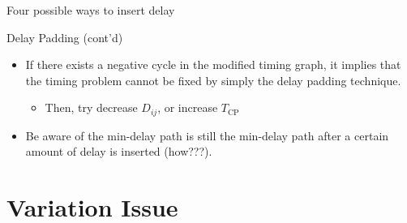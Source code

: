 \documentclass[10pt,ignorenonframetext,mathserif,onlymath]{beamer}
\providecommand{\tightlist}{%
  \setlength{\itemsep}{0pt}\setlength{\parskip}{0pt}}
\begin{document}
\begin{frame}{Four possible ways to insert delay}
\protect\hypertarget{four-possible-ways-to-insert-delay}{}

\begin{figure}[htpb]
\centering
{}
\subfigure[$p_s$, $p_h$ independently]{

}
\subfigure[$p_s = p_h$]{

}
\subfigure[$p_s \geq p_h$]{

}
\caption{}
\end{figure}

\end{frame}

\begin{frame}{Delay Padding (cont’d)}
\protect\hypertarget{delay-padding-contd}{}

\begin{itemize}
\tightlist
\item
  If there exists a negative cycle in the modified timing graph, it
  implies that the timing problem cannot be fixed by simply the delay
  padding technique.

  \begin{itemize}
  \tightlist
  \item
    Then, try decrease \(D_{ij}\), or increase \(T_\text{CP}\)
  \end{itemize}
\item
  Be aware of the min-delay path is still the min-delay path after a
  certain amount of delay is inserted (how???).
\end{itemize}

\end{frame}

\hypertarget{variation-issue}{%
\section{Variation Issue}\label{variation-issue}}
\end{document}
